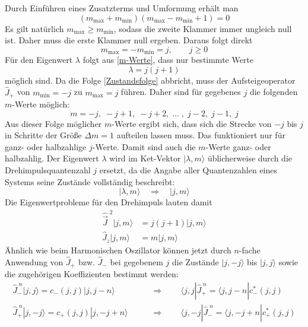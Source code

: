 \documentclass[9pt]{report}
\begin{document}
Durch Einführen eines Zusatzterms und Umformung erhält man
\begin{equation}
(m_{\mathrm{max}}+m_{\mathrm{min}})(m_{\mathrm{max}}-m_{\mathrm{min}}+1)=0
\end{equation}
Es gilt natürlich $m_{\mathrm{max}}\geq m_{\mathrm{min}}$, sodass die zweite Klammer immer ungleich null ist. Daher muss die erste Klammer null ergeben. Daraus folgt direkt
\begin{equation}
m_{\mathrm{max}}=-m_{\mathrm{min}}=j,\qquad j\geq 0
\end{equation}
Für den Eigenwert $\lambda$ folgt aus \eqref{m-Werte}, dass nur bestimmte Werte
\begin{equation}
\lambda = j(j+1)
\end{equation}
möglich sind. Da die Folge \eqref{Zustandsfolge} abbricht, muss der Aufsteigeoperator $\hat{J}_{+}$ von $m_{\mathrm{min}}=-j$ zu $m_{\mathrm{max}}=j$ führen. Daher sind für gegebenes $j$ die folgenden $m$-Werte möglich:
\begin{equation}
m=-j,\;-j+1,\;-j+2,\;...\;,\;j-2,\;j-1,\;j\label{Drehimpulsquantenzahlen}
\end{equation}
Aus dieser Folge möglicher $m$-Werte ergibt sich, dass sich die Strecke von $-j$ bis $j$ in Schritte der Größe $\Delta m=1$ aufteilen lassen muss. Das funktioniert nur für ganz- oder halbzahlige $j$-Werte. Damit sind auch die $m$-Werte ganz- oder halbzahlig. Der Eigenwert $\lambda$ wird im Ket-Vektor $|\lambda,m\rangle$ üblicherweise durch die Drehimpulsquantenzahl $j$ ersetzt, da die Angabe aller Quantenzahlen eines Systems seine Zustände vollständig beschreibt:
\begin{equation}
|\lambda,m\rangle\quad\Rightarrow\quad|j,m\rangle
\end{equation}
Die Eigenwertprobleme für den Drehimpuls lauten damit
\begin{align}
\hat{\vec{J}}^{\;2}|j,m\rangle &= j(j+1)|j,m\rangle\label{Eigenwertergebnis 1}\\
\hat{J}_{z}|j,m\rangle &= m|j,m\rangle\label{Eigenwertergebnis 2}
\end{align}
Ähnlich wie beim Harmonischen Oszillator können jetzt durch $n$-fache Anwendung von $\hat{J}_{+}$ bzw. $\hat{J}_{-}$ bei gegebenem $j$ die Zustände $|j,-j\rangle$ bis $|j,j\rangle$ sowie die zugehörigen Koeffizienten bestimmt werden:
\begin{align}
\hat{J}_{-}^{\;n}|j,j\rangle = c_{-}(j,j)|j,j-n\rangle\qquad &\Rightarrow\qquad\langle j,j|\hat{J}_{+}^{\;n} = \langle j,j-n|c_{-}^{*}(j,j)\\
\hat{J}_{+}^{\;n}|j,-j\rangle = c_{+}(j,j)|j,-j+n\rangle\qquad &\Rightarrow\qquad\langle j,-j|\hat{J}_{-}^{\;n} = \langle j,-j+n|c_{+}^{*}(j,j)
\end{align}
\end{document}
